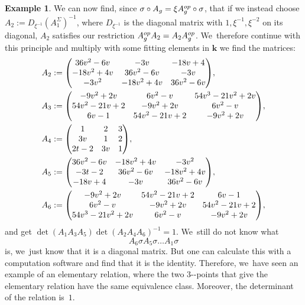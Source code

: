 \documentclass[10pt,a4paper]{amsart}
\providecommand{\nobreakdash}{\nobreak\hbox{-}}
\newcommand{\op}{\textup{op}}
\theoremstyle{definition}
\newtheorem{example}[theorem]{Example}
\newcommand{\kk}{{\boldsymbol{k}}}
\begin{document}
\begin{example}
We can now find, since $\sigma \circ A_g = \xi A_g^{\op} \circ \sigma$, that if we instead choose $A_2 := D_{\xi^{-1}} (A_1^{\Sigma})^{-1}$, where $D_{\xi^{-1}}$ is the diagonal matrix with $1,\xi^{-1},\xi^{-2}$ on its diagonal, $A_2$ satisfies our restriction $A_g^{\op} A_2 = A_2 A_g^{\op}$. We~therefore continue with this principle and multiply with some fitting elements in $\kk$ we find the matrices:\vspace*{-3pt}
\bgroup
\begin{align*}
\arraycolsep4.5pt
A_2 &:= \begin{pmatrix}
36v^2 - 6 v & -3v & -18v + 4 \\
-18 v^2 + 4v & 36v^2 - 6 v & -3v \\
-3v^2 & -18 v^2 + 4v & 36v^2 - 6 v \\
\end{pmatrix}\!,\\
A_3 &:= \begin{pmatrix}
-9 v^2 + 2v & 6v^2 - v & 54v^3 - 21 v^2 + 2v \\
54v^2 - 21 v + 2 & -9 v^2 + 2v & 6v^2 - v \\
6v - 1 & 54v^2 - 21 v + 2 & -9 v^2 + 2v \\
\end{pmatrix}\!,\\
A_4 &:= \begin{pmatrix}
1 & 2 & 3 \\
3v & 1 & 2 \\
2t-2 & 3v & 1 \\
\end{pmatrix}\!,\\
A_5 &:= \begin{pmatrix}
36v^2 - 6 v & -18 v^2 + 4v & -3v^2 \\
-3t-2 & 36v^2 - 6 v & -18 v^2 + 4v \\
-18 v + 4 & -3v & 36v^2 - 6 v \\
\end{pmatrix}\!,\\
A_6 &:= \begin{pmatrix}
-9 v^2 + 2v & 54v^2 - 21 v + 2 & 6v - 1 \\
6v^2 - v & -9 v^2 + 2v & 54v^2 - 21 v + 2 \\
54v^3 - 21 v^2 + 2v & 6v^2 - v & -9 v^2 + 2v \\
\end{pmatrix}\!,
\end{align*}
\egroup%
and get $\det(A_1A_3A_5)\det(A_2A_4A_6)^{-1} = 1$. We~still do not know what\vspace*{-3pt}
\[
A_6 \sigma A_5 \sigma \dots A_1 \sigma
\]
is, we~just know that it is a diagonal matrix. But one can calculate this with a computation software and find that it is the identity. Therefore, we~have seen an example of an elementary relation, where the two $3$\nobreakdash-points that give the elementary relation have the same equivalence class. Moreover, the determinant of the relation is~$1$.
\end{example}
\end{document}
